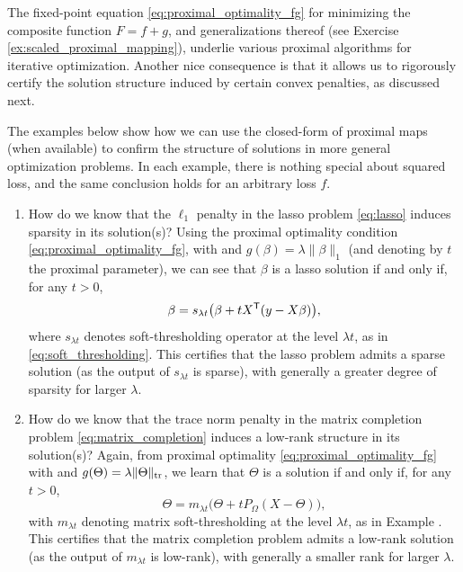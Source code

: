 The fixed-point equation \eqref{eq:proximal_optimality_fg} for minimizing the
composite function $F = f+g$, and generalizations thereof (see Exercise
\ref{ex:scaled_proximal_mapping}), underlie various proximal algorithms for    
iterative optimization. Another nice consequence is that it allows us to
rigorously certify the solution structure induced by certain convex penalties,
as discussed next.    

\begin{Example}
\label{xa:proximal_optimality}
The examples below show how we can use the closed-form of proximal maps (when
available) to confirm the structure of solutions in more general optimization
problems. In each example, there is nothing special about squared loss, and the
same conclusion holds for an arbitrary loss $f$.   

\begin{enumerate}[label=\alph*., ref=\alph*]
\item How do we know that the $\ell_1$ penalty in the lasso problem
  \eqref{eq:lasso} induces sparsity in its solution(s)? Using the proximal
  optimality condition \eqref{eq:proximal_optimality_fg}, with  and $g(\beta) = \lambda \|\beta\|_1$
  (and denoting by $t$ the proximal parameter), we can see that $\beta$ is a
  lasso solution if and only if, for any $t>0$,   
  \[
  \beta = s_{\lambda t} \big( \beta + t X^{\mathsf{T}} (y - X\beta) \big),
  \]
  where $s_{\lambda t}$ denotes soft-thresholding operator at the level
  $\lambda t$, as in \eqref{eq:soft_thresholding}. This certifies that the lasso
  problem admits a sparse solution (as the output of $s_{\lambda t}$ is sparse),
  with generally a greater degree of sparsity for larger $\lambda$.     

\item How do we know that the trace norm penalty in the matrix completion
  problem \eqref{eq:matrix_completion} induces a low-rank structure in its
  solution(s)? Again, from proximal optimality \eqref{eq:proximal_optimality_fg}
  with  and
  $g(\Theta) = \lambda \|\Theta\|_{\operatorname{tr}}$, we learn that $\Theta$ is a solution
  if and only if, for any $t>0$, 
  \[
  \Theta = m_{\lambda t} \big( \Theta + t P_\Omega (X - \Theta) \big),
  \]
  with $m_{\lambda t}$ denoting matrix soft-thresholding at the level $\lambda
  t$, as in Example . This certifies that
  the matrix completion problem admits a low-rank solution (as the output of
  $m_{\lambda t}$ is low-rank), with generally a smaller rank for larger
  $\lambda$.       
\end{enumerate}
\end{Example}

